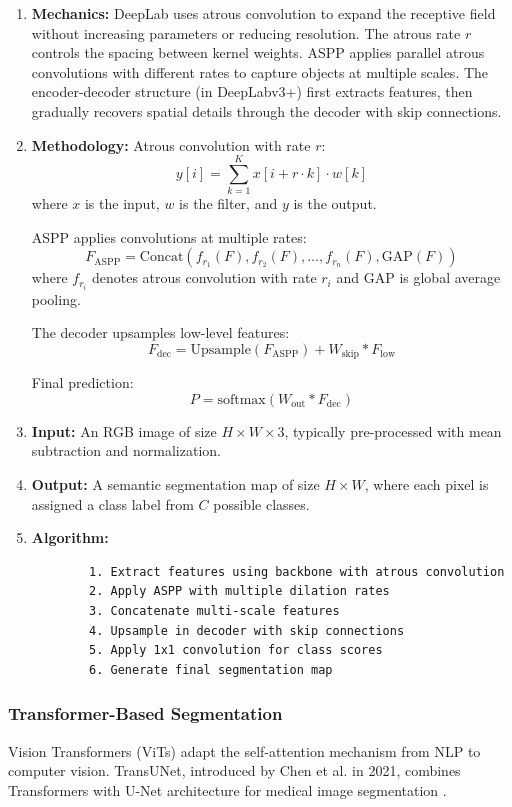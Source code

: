 \documentclass[conference]{IEEEtran}
\begin{document}
\begin{enumerate}
	\item \textbf{Mechanics:}
	DeepLab uses atrous convolution to expand the receptive field without increasing parameters or reducing resolution. The atrous rate $r$ controls the spacing between kernel weights. ASPP applies parallel atrous convolutions with different rates to capture objects at multiple scales. The encoder-decoder structure (in DeepLabv3+) first extracts features, then gradually recovers spatial details through the decoder with skip connections.
	
	\item \textbf{Methodology:}
	Atrous convolution with rate $r$:
	\[
	y[i] = \sum_{k=1}^K x[i + r \cdot k] \cdot w[k]
	\]
	where $x$ is the input, $w$ is the filter, and $y$ is the output.
	
	ASPP applies convolutions at multiple rates:
	\[
	F_{\text{ASPP}} = \text{Concat}(f_{r_1}(F), f_{r_2}(F), \ldots, f_{r_n}(F), \text{GAP}(F))
	\]
	where $f_{r_i}$ denotes atrous convolution with rate $r_i$ and $\text{GAP}$ is global average pooling.
	
	The decoder upsamples low-level features:
	\[
	F_{\text{dec}} = \text{Upsample}(F_{\text{ASPP}}) + W_{\text{skip}} * F_{\text{low}}
	\]
	
	Final prediction:
	\[
	P = \text{softmax}(W_{\text{out}} * F_{\text{dec}})
	\]
	
	\item \textbf{Input:}
	An RGB image of size $H \times W \times 3$, typically pre-processed with mean subtraction and normalization.
	
	\item \textbf{Output:}
	A semantic segmentation map of size $H \times W$, where each pixel is assigned a class label from $C$ possible classes.
	
	\item \textbf{Algorithm:}
	\begin{lstlisting}
		1. Extract features using backbone with atrous convolution
		2. Apply ASPP with multiple dilation rates
		3. Concatenate multi-scale features
		4. Upsample in decoder with skip connections
		5. Apply 1x1 convolution for class scores
		6. Generate final segmentation map
	\end{lstlisting}
\end{enumerate}

\subsubsection{Transformer-Based Segmentation}
Vision Transformers (ViTs) adapt the self-attention mechanism from NLP to computer vision. TransUNet, introduced by Chen et al. in 2021, combines Transformers with U-Net architecture for medical image segmentation \cite{chen2021transunet}.
\end{document}
